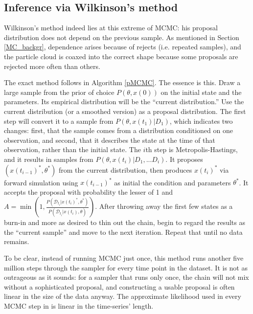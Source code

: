 \documentclass{article}
\begin{document}
\subsection{Inference via Wilkinson's method}
Wilkinson's method indeed lies at this extreme of MCMC: his proposal distribution does not depend on the previous sample. As mentioned in Section \ref{MC_backgr}, dependence arises because of rejects (i.e. repeated samples), and the particle cloud is coaxed into the correct shape because some proposals are rejected more often than others. 

The exact method follows in Algorithm \ref{pMCMC}. The essence is this. Draw a large sample from the prior of choice $P(\theta, x(0))$ on the initial state and the parameters. Its empirical distribution will be the ``current distribution.'' Use the current distribution (or a smoothed version) as a proposal distribution. The first step will convert it to a sample from $P(\theta, x(t_1)|D_1)$, which indicates two changes: first, that the sample comes from a distribution conditioned on one observation, and second, that it describes the state at the time of that observation, rather than the initial state. The $i$th step is Metropolis-Hastings, and it results in samples from $P(\theta, x(t_i)|D_{1}, ...D_{i})$. It proposes $(x(t_{i-1})^*, \theta^*)$ from the current distribution, then produces $x(t_{i})^*$ via forward simulation using $x(t_{i-1})^*$ as initial the condition and parameters $\theta^*$. It accepts the proposal with probability the lesser of 1 and $A=\min(1, \frac{P(\mathcal{D}_{t_{i}}|x(t_{i})^*, \theta^*)}{P(\mathcal{D}_{t_{i}}|x(t_{i}), \theta)})$. After throwing away the first few states as a burn-in and more as desired to thin out the chain, begin to regard the results as the ``current sample'' and move to the next iteration. Repeat that until no data remains.

To be clear, instead of running MCMC just once, this method runs another five million steps through the sampler for every time point in the dataset. It is not as outrageous as it sounds: for a sampler that runs only once, the chain will not mix without a sophisticated proposal, and constructing a usable proposal is often linear in the size of the data anyway. The approximate likelihood used in every MCMC step in \cite{golightly2011bayesian} is linear in the time-series' length.
\end{document}
